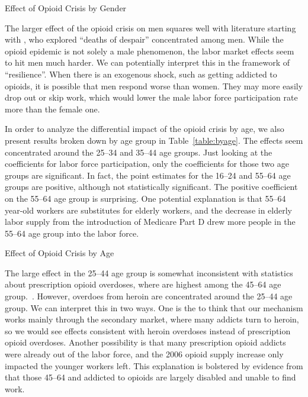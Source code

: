 \documentclass[12pt]{article}
\begin{document}
\begin{table}
    \footnotesize
    \centering
    \caption{Effect of Opioid Crisis by Gender}
    
    \label{table:bysex}
\end{table}

The larger effect of the opioid crisis on men squares well with literature starting with \textcite{casedeaton}, who explored ``deaths of despair'' concentrated among men.  While the opioid epidemic is not solely a male phenomenon, the labor market effects seem to hit men much harder.  We can potentially interpret this in the framework of ``resilience''.  When there is an exogenous shock, such as getting addicted to opioids, it is possible that men respond worse than women.  They may more easily drop out or skip work, which would lower the male labor force participation rate more than the female one.

In order to analyze the differential impact of the opioid crisis by age, we also present results broken down by age group in Table~\ref{table:byage}.  The effects seem concentrated around the 25--34 and 35--44 age groups.  Just looking at the coefficients for labor force participation, only the coefficients for those two age groups are significant.  In fact, the point estimates for the 16--24 and 55--64 age groups are positive, although not statistically significant.  The positive coefficient on the 55--64 age group is surprising.  One potential explanation is that 55--64 year-old workers are substitutes for elderly workers, and the decrease in elderly labor supply from the introduction of Medicare Part D drew more people in the 55--64 age group into the labor force.  

\begin{table}
    \footnotesize
    \centering
    \caption{Effect of Opioid Crisis by Age}
    
    \label{table:byage}
\end{table}

The large effect in the 25--44 age group is somewhat inconsistent with statistics about prescription opioid overdoses, where are highest among the 45--64 age group.~.  However, overdoes from heroin are concentrated around the 25--44 age group.  We can interpret this in two ways.  One is the to think that our mechanism works mainly through the secondary market, where many addicts turn to heroin, so we would see effects consistent with heroin overdoses instead of prescription opioid overdoses.  Another possibility is that many prescription opioid addicts were already out of the labor force, and the 2006 opioid supply increase only impacted the younger workers left.  This explanation is bolstered by evidence from \textcite{krueger17} that those 45--64 and addicted to opioids are largely disabled and unable to find work.
\end{document}
